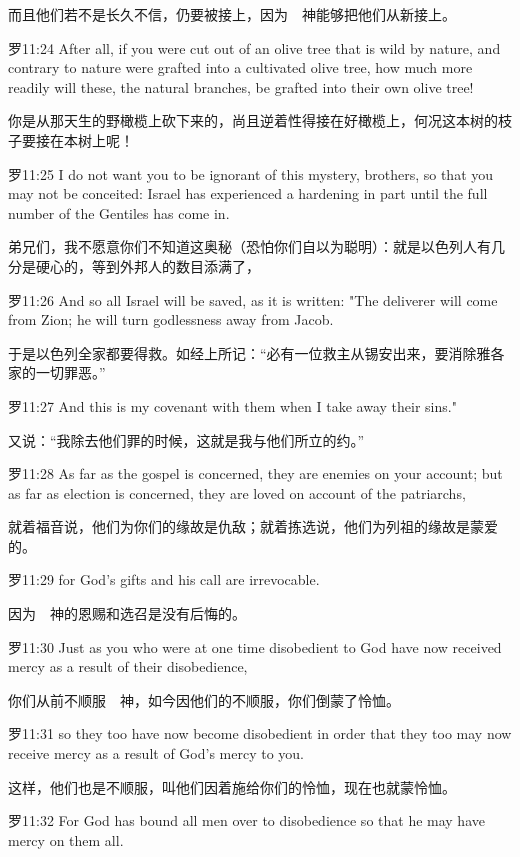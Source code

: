 \documentclass[a4paper,11pt,onecolumn,twoside]{ctexart}
\begin{document}
\begin{multicols}{2}
 而且他们若不是长久不信，仍要被接上，因为　神能够把他们从新接上。


 罗11:24
 After all, if you were cut out of an olive tree that is wild by nature, and contrary to nature were grafted into a cultivated olive tree, how much more readily will these, the natural branches, be grafted into their own olive tree!

 你是从那天生的野橄榄上砍下来的，尚且逆着性得接在好橄榄上，何况这本树的枝子要接在本树上呢！


 罗11:25
 I do not want you to be ignorant of this mystery, brothers, so that you may not be conceited: Israel has experienced a hardening in part until the full number of the Gentiles has come in.

 弟兄们，我不愿意你们不知道这奥秘（恐怕你们自以为聪明）：就是以色列人有几分是硬心的，等到外邦人的数目添满了，


 罗11:26
 And so all Israel will be saved, as it is written: "The deliverer will come from Zion; he will turn godlessness away from Jacob.

 于是以色列全家都要得救。如经上所记：“必有一位救主从锡安出来，要消除雅各家的一切罪恶。”


 罗11:27
 And this is my covenant with them when I take away their sins."

 又说：“我除去他们罪的时候，这就是我与他们所立的约。”


 罗11:28
 As far as the gospel is concerned, they are enemies on your account; but as far as election is concerned, they are loved on account of the patriarchs,

 就着福音说，他们为你们的缘故是仇敌；就着拣选说，他们为列祖的缘故是蒙爱的。


 罗11:29
 for God's gifts and his call are irrevocable.

 因为　神的恩赐和选召是没有后悔的。


 罗11:30
 Just as you who were at one time disobedient to God have now received mercy as a result of their disobedience,

 你们从前不顺服　神，如今因他们的不顺服，你们倒蒙了怜恤。


 罗11:31
 so they too have now become disobedient in order that they too may now receive mercy as a result of God's mercy to you.

 这样，他们也是不顺服，叫他们因着施给你们的怜恤，现在也就蒙怜恤。


 罗11:32
 For God has bound all men over to disobedience so that he may have mercy on them all.


\end{multicols}
\end{document}
